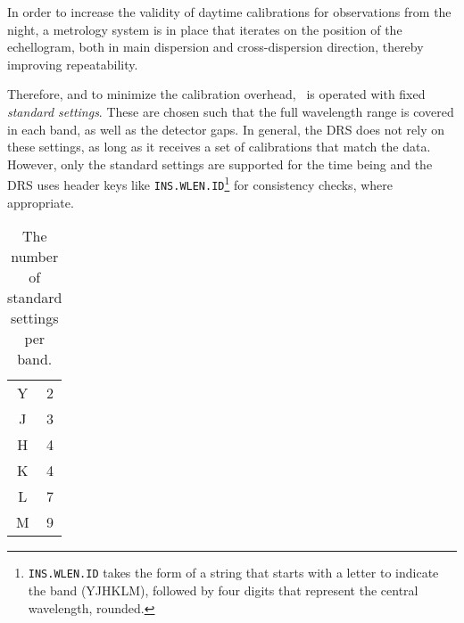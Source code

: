 In order to increase the validity of daytime calibrations for observations from
the night, a metrology system is in place that iterates on the position of the
echellogram, both in main dispersion and cross-dispersion direction, thereby
improving repeatability.

Therefore, and to minimize the calibration overhead, \instrument\ is operated
with fixed \emph{standard settings}. These are chosen such that the full
wavelength range is covered in each band, as well as the detector gaps. In
general, the DRS does not rely on these settings, as long as it receives a set
of calibrations that match the data. However, only the standard settings are
supported for the time being and the DRS uses header keys like
\texttt{INS.WLEN.ID}\footnote{\texttt{INS.WLEN.ID} takes the form of a string
that starts with a letter to indicate the band (YJHKLM), followed by four digits
that represent the central wavelength, rounded.} for consistency checks, where
appropriate.


\begin{table}[htbp]
  \centering\begin{tabular}{cc}
  Y  & 2\\
  J  & 3\\
  H  & 4\\
  K  & 4\\
  L  & 7\\
  M  & 9\\
  \end{tabular}
  \caption{The number of standard settings per band.}
  \label{tab:nsettings}
\end{table}
